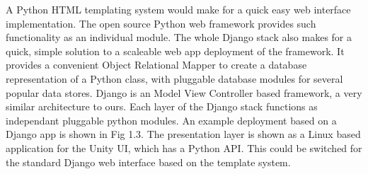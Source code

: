 \documentclass[11pt]{report}
\begin{document}
A Python HTML templating system would make for a quick easy web interface implementation. The open source Python web framework provides such functionality as an individual module. The whole Django stack also makes for a quick, simple solution to a scaleable web app deployment of the framework. It provides a convenient Object Relational Mapper to create a database representation of a Python class, with pluggable database modules for several popular data stores. Django is an Model View Controller based framework, a very similar architecture to ours. Each layer of the Django stack functions as independant pluggable python modules. An example deployment based on a Django app is shown in Fig 1.3. The presentation layer is shown as a Linux based application for the Unity UI, which has a Python API. This could be switched for the standard Django web interface based on the template system.
	
\end{document}
